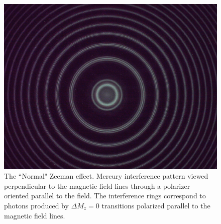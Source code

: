 \documentclass[twocolumn]{article}
\begin{document}
			\begin{figure}
				\centering
				\includegraphics[width=0.6\linewidth]{Images/Run1_ParallelPolarizer}
				\caption{The ``Normal" Zeeman effect. Mercury interference pattern viewed perpendicular to the magnetic field lines through a polarizer oriented parallel to the field. The interference rings correspond to photons produced by $\Delta M_z = 0$ transitions polarized parallel to the magnetic field lines.}
				\label{fig:Triplet90deg}
			\end{figure}
			
\end{document}
